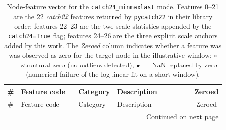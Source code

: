 {\small\sloppy
\setlength{\tabcolsep}{4pt}%
\renewcommand{\arraystretch}{1.05}%
\begin{longtable}{@{}c
  >{\ttfamily\raggedright\arraybackslash}p{0.30\linewidth}
  >{\raggedright\arraybackslash}p{0.18\linewidth}
  >{\raggedright\arraybackslash}p{0.40\linewidth}
  c@{}}
\caption{Node-feature vector for the \texttt{catch24\_minmaxlast} mode.
         Features 0--21 are the 22 \textit{catch22} features returned by
         \texttt{pycatch22} in their library order; features 22--23 are the
         two scale statistics appended by the \texttt{catch24=True} flag;
         features 24--26 are the three explicit scale anchors added by this
         work.  The \textit{Zeroed} column indicates whether a feature was
         was observed as zero for the target node in the illustrative window:
         $\circ$~=~structural zero (no outliers detected),
         $\bullet$~=~NaN replaced by zero (numerical failure of the
         log-linear fit on a short window).}
\label{tab:node_features} \\
\toprule
\# & Feature code & Category & Description & Zeroed \\
\midrule
\endfirsthead
\toprule
\# & Feature code & Category & Description & Zeroed \\
\midrule
\endhead
\midrule
\multicolumn{5}{r}{\footnotesize Continued on next page} \\
\endfoot
\bottomrule
\endlastfoot


\end{longtable}}
